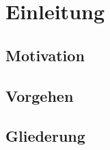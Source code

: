 \chapter{Einleitung}
\label{chap:einleitung}
\section{Motivation}
\label{sec:motivation}
\section{Vorgehen}
\label{sec:vorgehen}
\section{Gliederung}
\label{sec:gliederung}
